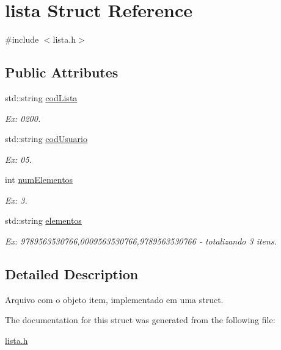 \hypertarget{structlista}{}\section{lista Struct Reference}
\label{structlista}


{\ttfamily \#include $<$lista.\+h$>$}

\subsection*{Public Attributes}
\begin{DoxyCompactItemize}
\item 
std\+::string \hyperlink{structlista_a2921193de086bd0b291c23709773238e}{cod\+Lista}\hypertarget{structlista_a2921193de086bd0b291c23709773238e}{}\label{structlista_a2921193de086bd0b291c23709773238e}

\begin{DoxyCompactList}\small\item\em Ex\+: 0200. \end{DoxyCompactList}\item 
std\+::string \hyperlink{structlista_a0d2393bfeac0eb1810805de8ece257b9}{cod\+Usuario}\hypertarget{structlista_a0d2393bfeac0eb1810805de8ece257b9}{}\label{structlista_a0d2393bfeac0eb1810805de8ece257b9}

\begin{DoxyCompactList}\small\item\em Ex\+: 05. \end{DoxyCompactList}\item 
int \hyperlink{structlista_a7b271fe291d842e7765545788556b705}{num\+Elementos}\hypertarget{structlista_a7b271fe291d842e7765545788556b705}{}\label{structlista_a7b271fe291d842e7765545788556b705}

\begin{DoxyCompactList}\small\item\em Ex\+: 3. \end{DoxyCompactList}\item 
std\+::string \hyperlink{structlista_ae816d2daec6eb1caae08e330007d2ecf}{elementos}\hypertarget{structlista_ae816d2daec6eb1caae08e330007d2ecf}{}\label{structlista_ae816d2daec6eb1caae08e330007d2ecf}

\begin{DoxyCompactList}\small\item\em Ex\+: 9789563530766,0009563530766,9789563530766 -\/ totalizando 3 itens. \end{DoxyCompactList}\end{DoxyCompactItemize}


\subsection{Detailed Description}
Arquivo com o objeto item, implementado em uma struct. 

The documentation for this struct was generated from the following file\+:\begin{DoxyCompactItemize}
\item 
\hyperlink{lista_8h}{lista.\+h}\end{DoxyCompactItemize}
